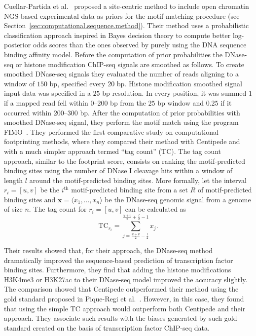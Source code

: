 Cuellar-Partida et al.~\cite{cuellar2012} proposed a site-centric method to include open chromatin NGS-based experimental data as priors for the motif matching procedure (see Section~\ref{sec:computational.sequence.method}). Their method uses a probabilistic classification approach inspired in Bayes decision theory to compute better log-posterior odds scores than the ones observed by purely using the DNA sequence binding affinity model. Before the computation of prior probabilities the DNase-seq or histone modification ChIP-seq signals are smoothed as follows. To create smoothed DNase-seq signals they evaluated the number of reads aligning to a window of $150$ bp, specified every $20$ bp. Histone modification smoothed signal input data was specified in a $25$ bp resolution. In every position, it was summed $ 1 $ if a mapped read fell within $0$--$200$ bp from the $25$ bp window and $ 0.25 $ if it occurred within $200$--$300$ bp. After the computation of prior probabilities with smoothed DNase-seq signal, they perform the motif match using the program FIMO~\cite{grant2011}. They performed the first comparative study on computational footprinting methods, where they compared their method with Centipede and with a much simpler approach termed ``tag count'' (TC). The tag count approach, similar to the footprint score, consists on ranking the motif-predicted binding sites using the number of DNase I cleavage hits within a window of length $l$ around the motif-predicted binding sites. More formally, let the interval $r_i = [u, v]$ be the $i^{\text{th}}$ motif-predicted binding site from a set $R$ of motif-predicted binding sites and $\mathbf{x} = \langle x_1, ..., x_n\rangle$ be the DNase-seq genomic signal from a genome of size $n$. The tag count for $r_i = [u, v]$ can be calculated as 
\begin{equation}
  \label{eq:tc}
  \text{TC}_{r_i} = \sum_{j={\frac{u+v}{2}-\frac{l}{2}}}^{\frac{u+v}{2}+\frac{l}{2}-1} {x}_{j}.
\end{equation}

Their results showed that, for their approach, the DNase-seq method dramatically improved the sequence-based prediction of transcription factor binding sites. Furthermore, they find that adding the histone modifications H3K4me3 or H3K27ac to their DNase-seq model improved the accuracy slightly. The comparison showed that Centipede outperformed their method using the gold standard proposed in Pique-Regi et al.~\cite{pique2011}. However, in this case, they found that using the simple TC approach would outperform both Centipede and their approach. They associate such results with the biases generated by such gold standard created on the basis of transcription factor ChIP-seq data.

